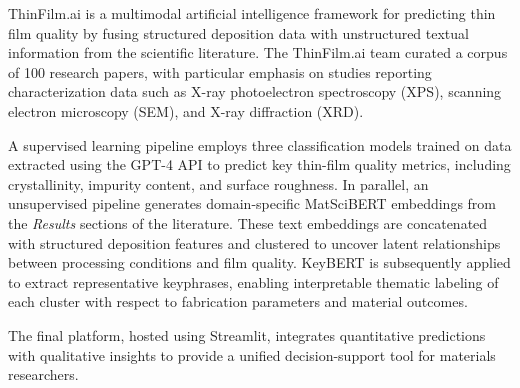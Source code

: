 


ThinFilm.ai is a multimodal artificial intelligence framework for predicting thin film quality by fusing structured deposition data with unstructured textual information from the scientific literature. The ThinFilm.ai team curated a corpus of 100 research papers, with particular emphasis on studies reporting characterization data such as X-ray photoelectron spectroscopy (XPS), scanning electron microscopy (SEM), and X-ray diffraction (XRD).

A supervised learning pipeline employs three classification models trained on data extracted using the GPT-4 API to predict key thin-film quality metrics, including crystallinity, impurity content, and surface roughness. In parallel, an unsupervised pipeline generates domain-specific MatSciBERT embeddings from the \emph{Results} sections of the literature. These text embeddings are concatenated with structured deposition features and clustered to uncover latent relationships between processing conditions and film quality. KeyBERT is subsequently applied to extract representative keyphrases, enabling interpretable thematic labeling of each cluster with respect to fabrication parameters and material outcomes.

The final platform, hosted using Streamlit, integrates quantitative predictions with qualitative insights to provide a unified decision-support tool for materials researchers.

